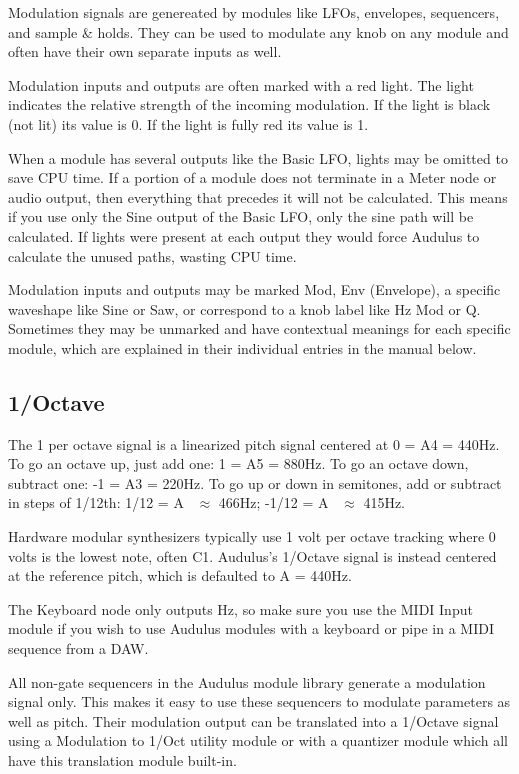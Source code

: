 \documentclass[11pt]{book}
\begin{document}
Modulation signals are genereated by modules like LFOs, envelopes, sequencers, and sample \& holds. They can be used to modulate any knob on any module and often have their own separate inputs as well.

Modulation inputs and outputs are often marked with a red light. The light indicates the relative strength of the incoming modulation. If the light is black (not lit) its value is 0. If the light is fully red its value is 1.

When a module has several outputs like the Basic LFO, lights may be omitted to save CPU time. If a portion of a module does not terminate in a Meter node or audio output, then everything that precedes it will not be calculated. This means if you use only the Sine output of the Basic LFO, only the sine path will be calculated. If lights were present at each output they would force Audulus to calculate the unused paths, wasting CPU time.

Modulation inputs and outputs may be marked Mod, Env (Envelope), a specific waveshape like Sine or Saw, or correspond to a knob label like Hz Mod or Q. Sometimes they may be unmarked and have contextual meanings for each specific module, which are explained in their individual entries in the manual below.

\subsection{1/Octave}

The 1 per octave signal is a linearized pitch signal centered at 0 = A4 = 440Hz. To go an octave up, just add one: 1 = A5 = 880Hz. To go an octave down, subtract one: -1 = A3 = 220Hz. To go up or down in semitones, add or subtract in steps of 1/12th: 1/12 = A \ $\approx$ 466Hz; -1/12 = A \ $\approx$ 415Hz. 

Hardware modular synthesizers typically use 1 volt per octave tracking where 0 volts is the lowest note, often C1. Audulus's 1/Octave signal is instead centered at the reference pitch, which is defaulted to A = 440Hz. 

The Keyboard node only outputs Hz, so make sure you use the MIDI Input module if you wish to use Audulus modules with a keyboard or pipe in a MIDI sequence from a DAW.

All non-gate sequencers in the Audulus module library generate a modulation signal only. This makes it easy to use these sequencers to modulate parameters as well as pitch. Their modulation output can be translated into a 1/Octave signal using a Modulation to 1/Oct utility module or with a quantizer module which all have this translation module built-in.
\end{document}
